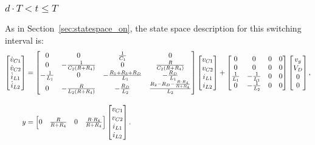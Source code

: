 \subsubsection{$d \cdot T < t \leq T$}
As in Section~\ref{sec:statespace_on}, the state space description for this switching interval is:
\begin{align*}
\begin{bmatrix}
\dispdot{v_{C1}} \\ \dispdot{v_{C2}} \\ \dispdot{i_{L1}} \\ \dispdot{i_{L2}}
\end{bmatrix}
& =
\begin{bmatrix}
0 & 0 & \frac{1}{C_1} & 0\\
0 & \minus\frac{1}{C_2(R + R_4)} & 0 & \frac{R}{C_2(R + R_4)}\\
\minus\frac{1}{L_1} & 0 & \minus\frac{R_1 + R_3 + R_D}{L_1} & \minus\frac{R_D}{L_1}\\
0 & \minus\frac{R}{L_2(R + R_4)} & \minus\frac{R_D}{L_2} & \frac{R_2 - R_D - \frac{R \cdot R_4}{R + R_4}}{L_2}
\end{bmatrix}
\begin{bmatrix}
v_{C1} \\ v_{C2} \\ i_{L1} \\ i_{L2}
\end{bmatrix}
+
\begin{bmatrix}
0 & 0 & 0 & 0\\
0 & 0 & 0 & 0\\
\frac{1}{L_1} & {-}\frac{1}{L_1} & 0 & 0\\
0 & {-}\frac{1}{L_2} & 0 & 0
\end{bmatrix}
\begin{bmatrix}
v_g \\ V_D \\ 0 \\ 0
\end{bmatrix},
\\[11pt]
y &=
\begin{bmatrix}
0 & \frac{R}{R + R_4} & 0 & \frac{R \cdot R_4}{R + R_4}
\end{bmatrix}
\begin{bmatrix}
v_{C1} \\ v_{C2} \\ i_{L1} \\ i_{L2}
\end{bmatrix}.
\end{align*}
